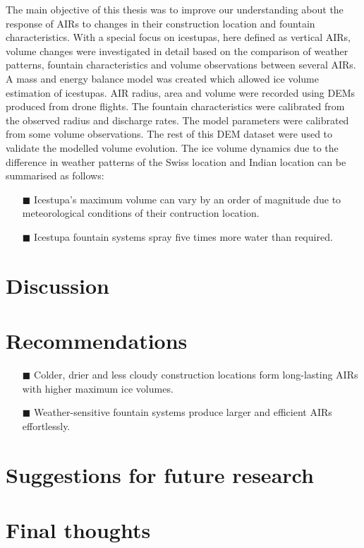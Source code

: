 The main objective of this thesis was to improve our understanding about the response of AIRs to changes in
their construction location and fountain characteristics. With a special focus on icestupas, here defined as
vertical AIRs, volume changes were investigated in detail based on the comparison of weather patterns, fountain
characteristics and volume observations between several AIRs. A mass and energy balance model was created which allowed
ice volume estimation of icestupas. AIR radius, area and volume were recorded using DEMs produced from drone
flights. The fountain characteristics were calibrated from the observed radius and discharge rates. The model
parameters were calibrated from some volume observations. The rest of this DEM dataset were used to validate the
modelled volume evolution. The ice volume dynamics due to the difference in weather patterns of the Swiss
location and Indian location can be summarised as follows: 

\begin{itemize} 

\item[\tiny{$\blacksquare$}] Icestupa's maximum volume can vary by an order of magnitude due to meteorological
  conditions of their contruction location. 

\item[\tiny{$\blacksquare$}] Icestupa fountain systems spray five times more water than required.

\end{itemize}



\section{Discussion}

\section{Recommendations}

\begin{itemize} 

\item[\tiny{$\blacksquare$}] Colder, drier and less cloudy construction locations form long-lasting AIRs with
  higher maximum ice volumes. 

\item[\tiny{$\blacksquare$}] Weather-sensitive fountain systems produce larger and efficient AIRs effortlessly. 

\end{itemize}

\section{Suggestions for future research}

\section{Final thoughts}
